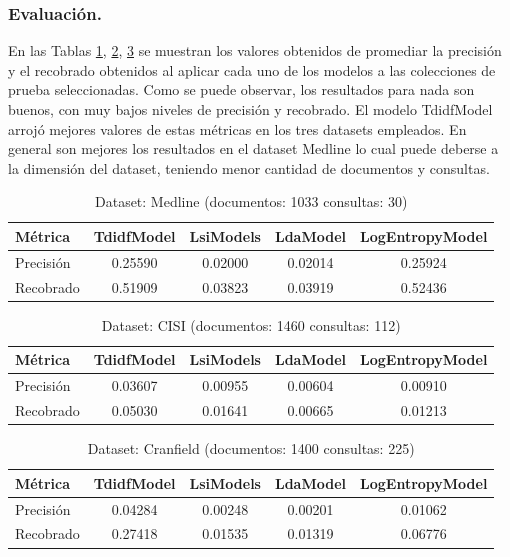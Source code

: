 \documentclass{llncs}
\begin{document}
\subsubsection{Evaluación.} 
En las Tablas \ref{medline}, \ref{cisi}, \ref{cran} se muestran los valores obtenidos de promediar la precisión y el recobrado obtenidos al aplicar cada uno de los modelos a las colecciones de prueba seleccionadas. Como se puede observar, los resultados para nada son buenos, con muy bajos niveles de precisión y recobrado. El modelo TdidfModel arrojó mejores valores de estas métricas en los tres datasets empleados. En general son mejores los resultados en el dataset Medline lo cual puede deberse a la dimensión del dataset, teniendo menor cantidad de documentos y consultas.

\begin{table}
	\caption{Dataset: Medline (documentos: 1033 consultas: 30)}
	\label{medline} 
	\begin{tabular}{|l|c|c|c|c|}
		\hline
		\textbf{Métrica} & \textbf{TdidfModel} & \textbf{LsiModels} & \textbf{LdaModel} &  \textbf{LogEntropyModel} \\
		\hline
		Precisión & 0.25590 & 0.02000 & 0.02014 & 0.25924 \\
		\hline
		Recobrado & 0.51909 & 0.03823 & 0.03919 & 0.52436 \\
		\hline
	\end{tabular} 
\end{table}

\begin{table}
	\caption{Dataset: CISI (documentos: 1460 consultas: 112)}
	\label{cisi}
	\begin{tabular}{|l|c|c|c|c|}
		\hline
		\textbf{Métrica} & \textbf{TdidfModel} & \textbf{LsiModels} & \textbf{LdaModel} &  \textbf{LogEntropyModel} \\
		\hline		
		Precisión & 0.03607 & 0.00955 & 0.00604 & 0.00910 \\
		\hline
		Recobrado & 0.05030 & 0.01641 & 0.00665 & 0.01213 \\
		\hline
	\end{tabular} 
\end{table}

\begin{table}
	\caption{Dataset: Cranfield (documentos: 1400 consultas: 225)}
	\label{cran}
	\begin{tabular}{|l|c|c|c|c|}
		\hline
		\textbf{Métrica} & \textbf{TdidfModel} & \textbf{LsiModels} & \textbf{LdaModel} &  \textbf{LogEntropyModel} \\
		\hline
		Precisión & 0.04284 & 0.00248 & 0.00201 & 0.01062 \\
		\hline
		Recobrado & 0.27418 & 0.01535 & 0.01319 & 0.06776 \\
		\hline
	\end{tabular} 
\end{table}
\end{document}
